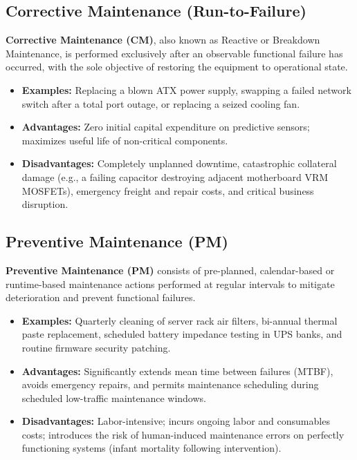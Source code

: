 \subsection{Corrective Maintenance (Run-to-Failure)}
\textbf{Corrective Maintenance (CM)}, also known as Reactive or Breakdown Maintenance, is performed exclusively after an observable functional failure has occurred, with the sole objective of restoring the equipment to operational state.
\begin{itemize}[leftmargin=*]
    \item \textbf{Examples:} Replacing a blown ATX power supply, swapping a failed network switch after a total port outage, or replacing a seized cooling fan.
    \item \textbf{Advantages:} Zero initial capital expenditure on predictive sensors; maximizes useful life of non-critical components.
    \item \textbf{Disadvantages:} Completely unplanned downtime, catastrophic collateral damage (e.g., a failing capacitor destroying adjacent motherboard VRM MOSFETs), emergency freight and repair costs, and critical business disruption.
\end{itemize}

\subsection{Preventive Maintenance (PM)}
\textbf{Preventive Maintenance (PM)} consists of pre-planned, calendar-based or runtime-based maintenance actions performed at regular intervals to mitigate deterioration and prevent functional failures.
\begin{itemize}[leftmargin=*]
    \item \textbf{Examples:} Quarterly cleaning of server rack air filters, bi-annual thermal paste replacement, scheduled battery impedance testing in UPS banks, and routine firmware security patching.
    \item \textbf{Advantages:} Significantly extends mean time between failures (MTBF), avoids emergency repairs, and permits maintenance scheduling during scheduled low-traffic maintenance windows.
    \item \textbf{Disadvantages:} Labor-intensive; incurs ongoing labor and consumables costs; introduces the risk of human-induced maintenance errors on perfectly functioning systems (infant mortality following intervention).
\end{itemize}

